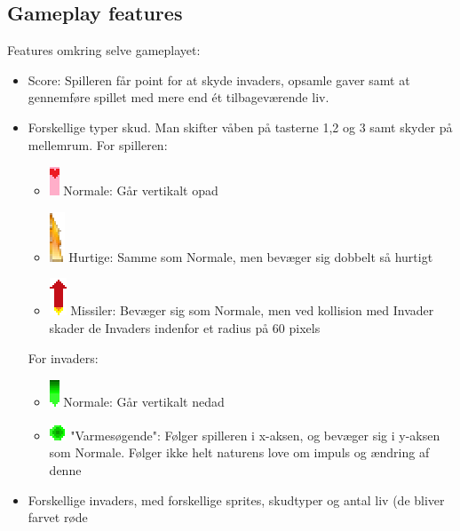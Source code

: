 \documentclass[titlepage,danish]{article}
\begin{document}
\subsection{Gameplay features}Features omkring selve gameplayet:
\begin{itemize}
\item Score: Spilleren får point for at skyde invaders, opsamle gaver samt at gennemføre spillet med
  mere end ét tilbageværende liv.
\item Forskellige typer skud. Man skifter våben på tasterne 1,2 og 3 samt skyder på mellemrum. For
  spilleren:
  \begin{itemize}
  \item \includegraphics[scale=0.60]{bullet.eps} Normale: Går vertikalt opad
  \item \includegraphics[scale=0.60]{fastBullet.eps} Hurtige: Samme som Normale, men bevæger sig
    dobbelt så hurtigt
  \item \includegraphics[scale=0.60]{missile.eps} Missiler: Bevæger sig som Normale, men ved
    kollision med Invader skader de Invaders indenfor et radius på 60 pixels
  \end{itemize} For invaders:
  \begin{itemize}
  \item \includegraphics[scale=0.60]{bulletInvader.eps} Normale: Går vertikalt nedad
  \item \includegraphics[scale=0.60]{bulletInvaderHoming.eps} "Varmesøgende": Følger spilleren i
    x-aksen, og bevæger sig i y-aksen som Normale. Følger ikke helt naturens love om impuls og
    ændring af denne
  \end{itemize}
\item Forskellige invaders, med forskellige sprites, skudtyper og antal liv (de bliver farvet røde

\end{itemize}
\end{document}

